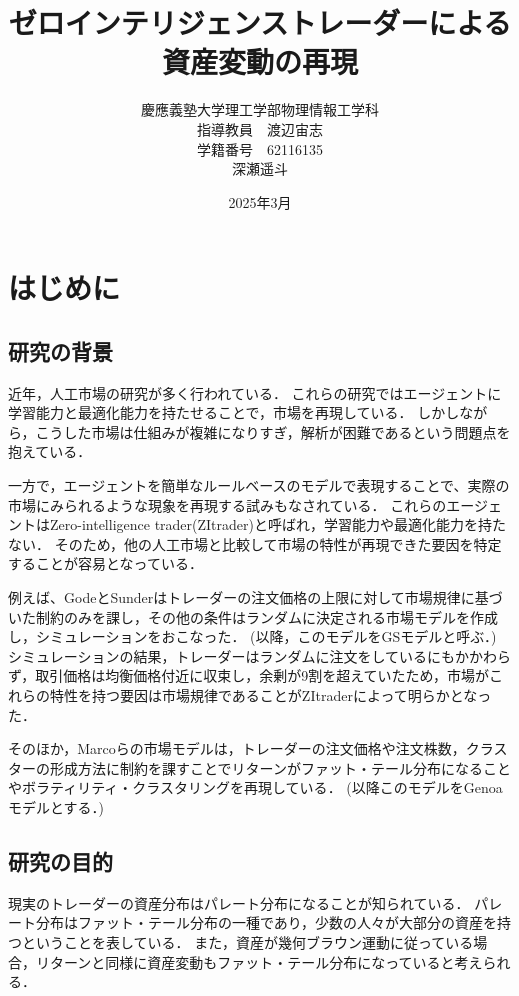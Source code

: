 \documentclass[titlepage]{jsreport}
\title{ゼロインテリジェンストレーダーによる資産変動の再現}
\author{慶應義塾大学理工学部物理情報工学科\\
指導教員　渡辺宙志\\
学籍番号　62116135\\
深瀬遥斗}
\date{2025年3月}
\begin{document}
\maketitle
\setcounter{tocdepth}{2}
\tableofcontents

\chapter{はじめに} \label{chap:introduction}

\section{研究の背景}
近年，人工市場の研究が多く行われている\cite{artificial_market1,artificial_market2,artificial_market3,artificial_market4}．
これらの研究ではエージェントに学習能力と最適化能力を持たせることで，市場を再現している．
しかしながら，こうした市場は仕組みが複雑になりすぎ，解析が困難であるという問題点を抱えている\cite{Genoa}．

一方で，エージェントを簡単なルールベースのモデルで表現することで、実際の市場にみられるような現象を再現する試みもなされている\cite{zit1,zit2}．
これらのエージェントはZero-intelligence trader(ZItrader)と呼ばれ，学習能力や最適化能力を持たない．
そのため，他の人工市場と比較して市場の特性が再現できた要因を特定することが容易となっている．

例えば、GodeとSunderはトレーダーの注文価格の上限に対して市場規律に基づいた制約のみを課し，その他の条件はランダムに決定される市場モデルを作成し，シミュレーションをおこなった\cite{Gode_and_Sunder}．
(以降，このモデルをGSモデルと呼ぶ．)
シミュレーションの結果，トレーダーはランダムに注文をしているにもかかわらず，取引価格は均衡価格付近に収束し，余剰が9割を超えていたため，市場がこれらの特性を持つ要因は市場規律であることがZItraderによって明らかとなった．

そのほか，Marcoらの市場モデルは，トレーダーの注文価格や注文株数，クラスターの形成方法に制約を課すことでリターンがファット・テール分布になることやボラティリティ・クラスタリングを再現している\cite{Genoa}．
(以降このモデルをGenoaモデルとする．)

\section{研究の目的}
現実のトレーダーの資産分布はパレート分布になることが知られている\cite{Pareto}．
パレート分布はファット・テール分布の一種であり，少数の人々が大部分の資産を持つということを表している\cite{Pareto_fat-tailed}．
また，資産が幾何ブラウン運動に従っている場合，リターンと同様に資産変動もファット・テール分布になっていると考えられる．
\end{document}
